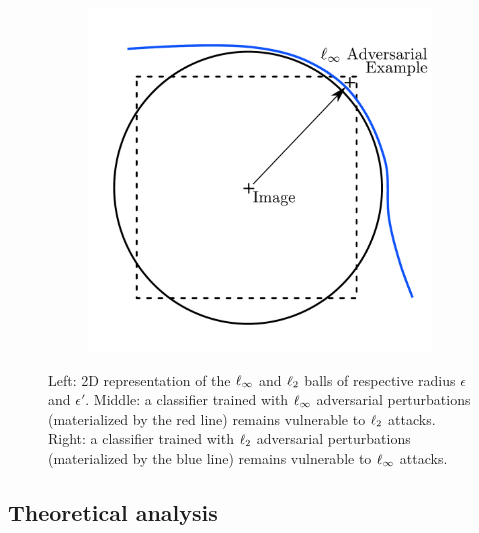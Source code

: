 \begin{figure}
\begin{subfigure}[b]{0.32\textwidth}
       \caption{}
       \label{figure:ap3-ball_adversarial_l2}
   \end{subfigure}
   \hfill
   \begin{subfigure}[b]{0.32\textwidth}
       \centering
       \includegraphics[scale=0.22]{figures/appendix3/ball_adversarial_linf.pdf}
       \caption{}
       \label{figure:ap3-ball_adversarial_linf}
   \end{subfigure}
   \caption{Left: 2D representation of the $\ell_\infty $ and $\ell_2 $ balls of respective radius $\epsilon$ and $\epsilon'$. 
    Middle: a classifier trained with $\ell_\infty $ adversarial perturbations  (materialized by the red line) remains vulnerable to $\ell_2 $ attacks. 
    Right: a classifier trained with $\ell_2 $ adversarial perturbations (materialized by the blue line) remains vulnerable to $\ell_\infty $ attacks.}
\end{figure}


\subsection{Theoretical analysis}
\label{subsection:ap3-theoretical_analysis}


